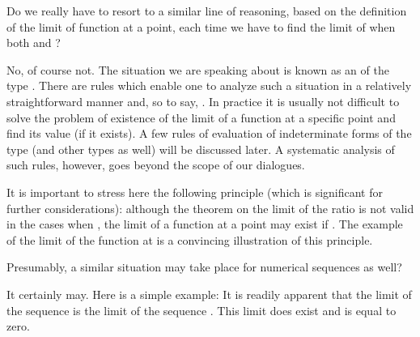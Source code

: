 \begin{s}
Do we really have to resort to a similar line of reasoning, based on the definition of the limit of function at a point, each time we have to find the limit of  when both  and  ?
\end{s}

\begin{p}
No, of course not. The situation we are speaking about is known as an  of the type . There are rules which enable one to analyze such a situation in a relatively straightforward manner and, so to say, . In practice it is usually not difficult to solve the problem of existence of the limit of a function  at a specific point and find its value (if it exists). A few rules of evaluation of indeterminate forms of the type  (and other types as well) will be discussed later. A systematic analysis of such rules, however, goes beyond the scope of our dialogues.

It is important to stress here the following principle (which is significant for further considerations): although the theorem on the limit of the ratio is not valid in the cases when , the limit of a function  at a point  may exist if . The example of the limit of the function  at  is a convincing illustration of this principle.
\end{p}

\begin{s}
Presumably, a similar situation may take place for numerical sequences as well?
\end{s}


\begin{p}
It certainly may. Here is a simple example: 
It is readily apparent that the limit of the sequence  is the limit of the sequence . This limit does exist and is equal to zero.
\end{p}

